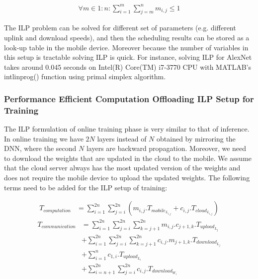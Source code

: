 \begin{equation}
      \begin{split}
\forall m \in {1:n}: \sum_{i=1}^{m}{\sum_{j=m}^{n}{m_{i,j}}} \leq 1
  \end{split}
\end{equation}

The ILP problem can be solved for different set of parameters (e.g. different uplink and download speeds), and then the scheduling results can be stored as a look-up table in the mobile device. Moreover because the number of variables in this setup is tractable solving ILP is quick. For instance, solving ILP for AlexNet takes around 0.045 seconds on Intel(R) Core(TM) i7-3770 CPU with MATLAB\textregistered's intlinprog() function using primal simplex algorithm.\\
\subsubsection{Performance Efficient Computation Offloading ILP Setup for Training}
The ILP formulation of online training phase is very similar to that of inference. In online training we have $2N$ layers instead of $N$ obtained by mirroring the DNN, where the second $N$ layers are backward propagation. Moreover, we need to download the weights that are updated in the cloud to the mobile. We assume that the cloud server always has the most updated version of the weights and does not require the mobile device to upload the updated weights. The following terms need to be added for the ILP setup of training:

\begin{equation}
      \begin{split}
T_{computation} &= \sum_{i=1}^{2n}{\sum_{j=i}^{2n}{
(m_{i,j}.T_{mobile_{L_{i,j}}} + c_{i,j}.T_{cloud_{L_{i,j}}})
}}\label{eq: full_pass_comp}
  \end{split}
\end{equation}
  \begin{equation}
      \begin{split}
T_{communication} &= \sum_{i=1}^{2n}{\sum_{j=i}^{2n}{\sum_{k=j+1}^{2n}{m_{i,j}.c_{j+1,k}.T_{upload_{L_j}}}}} \\
& + \sum_{i=1}^{2n}{\sum_{j=i}^{2n}{\sum_{k=j+1}^{2n}{c_{i,j}.m_{j+1,k}.T_{download_{L_j}}}}} \\
& + \sum_{i=1}^{n}{c_{1,i}.T_{upload_{L_i}}} \\
& + \sum_{i=n+1}^{2n}{\sum_{j=i}^{2n}{c_{i,j}.T_{download_{W_{i}}}}}
  \end{split}
\end{equation}

